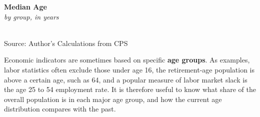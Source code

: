 \documentclass{report}
\makeatletter
\newcommand{\tbllink}[1]{\href{https://raw.githubusercontent.com/bdecon/US-chartbook/master/chartbook/data/#1}{\faTable}}
\newcommand*\short[1]{\expandafter\@gobbletwo\number\numexpr#1\relax}
\newcommand{\absnode}[3]{\node[below right, align=left] at (axis cs: #1,#2) {#3};}
\newcommand{\shdateaxisticks}{
		date coordinates in=x, axis line style={draw=none},
		xmax={2023-02-15},
		max space between ticks=40,	    
		xtick={{1990-01-01}, {1995-01-01}, {2000-01-01}, 
			{2005-01-01}, {2010-01-01}, {2015-01-01}, {2020-01-01}},
		minor xtick={},
		enlarge y limits={0.06}, enlarge x limits={0.01},
		}
\newcommand{\bbar}[2]{extra #1 ticks = {{#2}}, extra #1 tick labels = ,
		extra #1 tick style = {grid=major, grid style={thick, black!25}},}
\newcommand{\stdline}[4]{\addplot[very thick, no markers, color=#1] 
		table [x=#2, y=#3, col sep=comma] {#4};	}
\newcommand{\rbars}{
		\fill[color=black!10] (axis cs:{1990-07-01},\pgfkeysvalueof{/pgfplots/ymin}) rectangle 
			(axis cs:{1991-03-01}, \pgfkeysvalueof{/pgfplots/ymax});
		\fill[color=black!10] (axis cs:{2007-12-01},\pgfkeysvalueof{/pgfplots/ymin}) rectangle 
			(axis cs:{2009-07-01}, \pgfkeysvalueof{/pgfplots/ymax});
		\fill[color=black!10] (axis cs:{2001-03-01},\pgfkeysvalueof{/pgfplots/ymin}) rectangle 
			(axis cs:{2001-11-01}, \pgfkeysvalueof{/pgfplots/ymax});
		\fill[color=black!10] (axis cs:{2020-02-01},\pgfkeysvalueof{/pgfplots/ymin}) rectangle 
			(axis cs:{2020-05-01}, \pgfkeysvalueof{/pgfplots/ymax});}
\makeatother
\begin{document}
{\begin{minipage}{0.76\textwidth}
\begin{minipage}{0.41\textwidth}
\small 
\end{minipage}\hfill
\begin{minipage}{0.53\textwidth}
\normalsize \textbf{Median Age}\\
\footnotesize{\textit{by group, in years}}\\
\noindent \hspace*{-2mm} \\
\footnotesize{Source: Author's Calculations from CPS} \hfill \tbllink{median_age.csv}
\end{minipage}
\vspace{3mm}

\small Economic indicators are sometimes based on specific \textbf{age groups}. As examples, labor statistics often exclude those under age 16, the retirement-age population is above a certain age, such as 64, and a popular measure of labor market slack is the age 25 to 54 employment rate. It is therefore useful to know what share of the overall population is in each major age group, and how the current age distribution compares with the past. 
\end{minipage}
\vspace{0.5mm}

}
\end{document}

